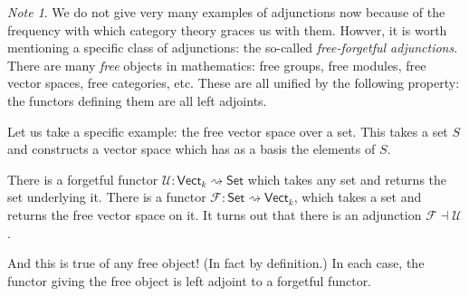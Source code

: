 \documentclass[a4paper]{report}
\theoremstyle{definition}
\theoremstyle{plain}
\theoremstyle{remark}
\newtheorem{note}{Note}[section]
\begin{document}
\begin{note}
  We do not give very many examples of adjunctions now because of the frequency with which category theory graces us with them. Howver, it is worth mentioning a specific class of adjunctions: the so-called \emph{free-forgetful adjunctions}. There are many \emph{free} objects in mathematics: free groups, free modules, free vector spaces, free categories, etc. These are all unified by the following property: the functors defining them are all left adjoints.

  Let us take a specific example: the free vector space over a set. This takes a set $S$ and constructs a vector space which has as a basis the elements of $S$.

  There is a forgetful functor $\mathcal{U}\colon \mathsf{Vect}_{k} \rightsquigarrow \mathsf{Set}$ which takes any set and returns the set underlying it. There is a functor $\mathcal{F}\colon \mathsf{Set} \rightsquigarrow \mathsf{Vect}_{k}$, which takes a set and returns the free vector space on it. It turns out that there is an adjunction $\mathcal{F} \dashv \mathcal{U}$.

  And this is true of any free object! (In fact by definition.) In each case, the functor giving the free object is left adjoint to a forgetful functor.
\end{note}
\end{document}
